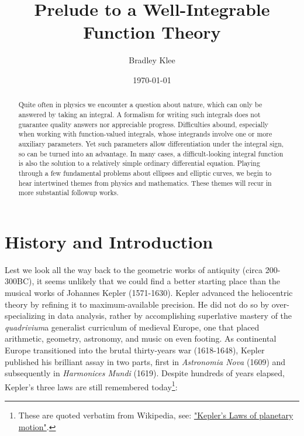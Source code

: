 \documentclass[nofootinbib,preprint]{revtex4-1}
\begin{document}
\title{Prelude to a Well-Integrable Function Theory}
\author{Bradley Klee}

\date{\today}

\begin{abstract}
Quite often in physics we encounter a question about nature, which can only be answered by taking 
an integral. A formalism for writing such integrals does not guarantee quality answers nor appreciable 
progress. Difficulties abound, especially when working with function-valued integrals, whose integrands 
involve one or more auxiliary parameters. Yet such parameters allow differentiation under the integral 
sign, so can be turned into an advantage. In many cases, a difficult-looking integral function is 
also the solution to a relatively simple ordinary differential equation. Playing through a few 
fundamental problems about ellipses and elliptic curves, we begin to hear intertwined themes 
from physics and mathematics. These themes will recur in more substantial followup works. 
\end{abstract}

\maketitle 

\section{History and Introduction}
Lest we look all the way back to the geometric works of antiquity 
(circa 200-300BC), it seems unlikely that we could find 
a better starting place than the musical works of Johannes Kepler (1571-1630).
Kepler advanced the heliocentric theory by refining it to maximum-available 
precision. He did not do so by over-specializing
in data analysis, rather by accomplishing superlative mastery of the 
\textit{quadrivium}\textemdash a generalist curriculum of medieval Europe, 
one that placed arithmetic, geometry, astronomy, and music on even footing.
As continental Europe transitioned into the brutal thirty-years war (1618-1648), 
Kepler published his brilliant assay in two parts, first 
in \textit{Astronomia Nova} (1609) and subsequently in \textit{Harmonices Mundi} 
(1619). Despite hundreds of years 
elapsed, Kepler's three laws are still remembered today\footnote{These
are quoted verbatim from Wikipedia, see:
\href{https://en.wikipedia.org/wiki/Kepler's_laws_of_planetary_motion
}{"Kepler's Laws of planetary motion"}.}:
\end{document}

